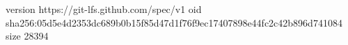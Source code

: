 version https://git-lfs.github.com/spec/v1
oid sha256:05d5e4d2353dc689b0b15f85d47d1f76f9ec17407898e44fc2c42b896d741084
size 28394
